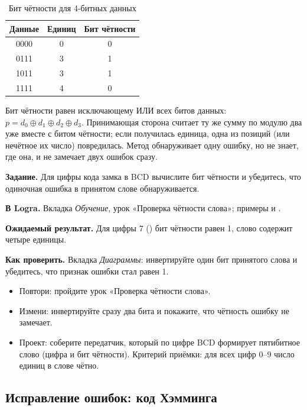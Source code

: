 \begin{table}[H]
\centering
\caption{Бит чётности для 4-битных данных}
\small
\begin{tabular}{ccc}
\toprule
\textbf{Данные} & \textbf{Единиц} & \textbf{Бит чётности} \\
\midrule
0000 & 0 & 0 \\
0111 & 3 & 1 \\
1011 & 3 & 1 \\
1111 & 4 & 0 \\
\bottomrule
\end{tabular}
\end{table}

Бит чётности равен исключающему ИЛИ всех битов данных: $p = d_0 \oplus d_1
\oplus d_2 \oplus d_3$. Принимающая сторона считает ту же сумму по модулю два
уже вместе с битом чётности; если получилась единица, одна из позиций (или
нечётное их число) повредилась. Метод обнаруживает одну ошибку, но не знает,
где она, и не замечает двух ошибок сразу.

\begin{diybox}
\textbf{Задание.} Для цифры кода замка в BCD вычислите бит чётности и
убедитесь, что одиночная ошибка в принятом слове обнаруживается.\par
\textbf{В Logra.} Вкладка \emph{Обучение}, урок «Проверка чётности слова»;
примеры  и .\par
\textbf{Ожидаемый результат.} Для цифры 7 () бит чётности равен 1,
слово  содержит четыре единицы.\par
\textbf{Как проверить.} Вкладка \emph{Диаграммы}: инвертируйте один бит
принятого слова и убедитесь, что признак ошибки стал равен 1.
\begin{itemize}[leftmargin=3.4em,labelwidth=3em,labelsep=0.4em,align=left]
  \item[\stars{1}] Повтори: пройдите урок «Проверка чётности слова».
  \item[\stars{2}] Измени: инвертируйте сразу два бита и покажите, что чётность
    ошибку не замечает.
  \item[\stars{3}] Проект: соберите передатчик, который по цифре BCD формирует
    пятибитное слово (цифра и бит чётности). Критерий приёмки: для
    всех цифр 0--9 число единиц в слове чётно.
\end{itemize}
\end{diybox}

\subsection{Исправление ошибок: код Хэмминга}

